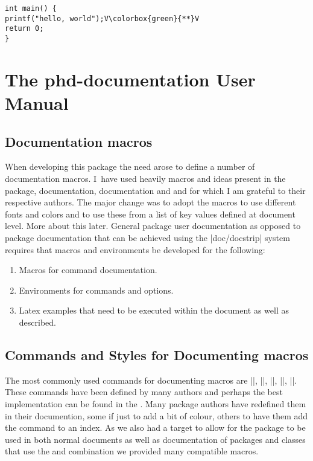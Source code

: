 \begin{lstlisting}
int main() {
printf("hello, world");V\colorbox{green}{**}V
return 0;
}
\end{lstlisting}



\chapter{The phd-documentation User Manual}


\section{Documentation macros}

When developing this package the need arose to define a number of documentation macros. I~have used heavily macros and ideas present in the  package,  documentation,  documentation  and  and for which I am grateful to their respective authors. The major change was to adopt the macros to use different fonts and colors and to use these from a list of key values defined at document level. More about this later. General package user documentation as opposed to package documentation that can be achieved using the |doc/docstrip| system requires that macros and environments be developed for the following:

\begin{enumerate}
\item Macros for command documentation.
\item Environments for commands and options.
\item Latex examples that need to be executed within the document as well as described.
\end{enumerate}


\section{Commands and Styles for Documenting macros}

The most commonly used commands for documenting macros are |\cs|, |\cmd|, |\meta|, |\marg|, |\oarg|. These commands have been defined by many authors and perhaps the best implementation can be found in the . Many package authors have redefined them in their documention, some if just to add a bit of colour, others to have them add the command to an index. As we also had a target to allow for
the package to be used in both normal documents as well as documentation
of packages and classes that use the  and  combination we provided many compatible macros.


